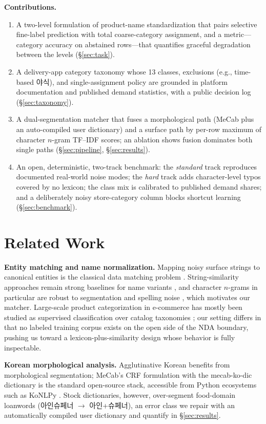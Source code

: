 \documentclass[10pt,twocolumn]{article}
\begin{document}
\smallskip
\noindent\textbf{Contributions.}
\begin{enumerate}
\item A two-level formulation of product-name standardization that pairs
  selective fine-label prediction with total coarse-category assignment, and
  a metric---category accuracy on abstained rows---that quantifies graceful
  degradation between the levels (\S\ref{sec:task}).
\item A delivery-app category taxonomy whose 13 classes, exclusions
  (e.g., time-based 야식), and single-assignment policy are grounded in
  platform documentation and published demand statistics, with a public
  decision log (\S\ref{sec:taxonomy}).
\item A dual-segmentation matcher that fuses a morphological path (MeCab
  plus an auto-compiled user dictionary) and a surface path by per-row
  maximum of character $n$-gram TF--IDF scores; an ablation shows fusion
  dominates both single paths (\S\ref{sec:pipeline}, \S\ref{sec:results}).
\item An open, deterministic, two-track benchmark: the \emph{standard} track
  reproduces documented real-world noise modes; the \emph{hard} track adds
  character-level typos covered by no lexicon; the class mix is calibrated
  to published demand shares; and a deliberately noisy store-category column
  blocks shortcut learning (\S\ref{sec:benchmark}).
\end{enumerate}

\section{Related Work}
\label{sec:related}

\textbf{Entity matching and name normalization.}
Mapping noisy surface strings to canonical entities is the classical data
matching problem \cite{christen2012}. String-similarity approaches remain
strong baselines for name variants \cite{cohen2003}, and character
$n$-grams in particular are robust to segmentation and spelling noise
\cite{cavnar1994,mcnamee2004}, which motivates our matcher. Large-scale
product categorization in e-commerce has mostly been studied as supervised
classification over catalog taxonomies \cite{cevahir2016}; our setting
differs in that no labeled training corpus exists on the open side of the
NDA boundary, pushing us toward a lexicon-plus-similarity design whose
behavior is fully inspectable.

\textbf{Korean morphological analysis.}
Agglutinative Korean benefits from morphological segmentation; MeCab's CRF
formulation \cite{kudo2004} with the mecab-ko-dic dictionary is the standard
open-source stack, accessible from Python ecosystems such as KoNLPy
\cite{park2014}. Stock dictionaries, however, over-segment food-domain
loanwords (아인슈페너 $\rightarrow$ 아인+슈페너), an error class we repair
with an automatically compiled user dictionary and quantify in
\S\ref{sec:results}.
\end{document}
